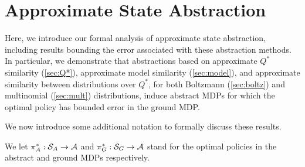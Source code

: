 \section{Approximate State Abstraction}

Here, we introduce our formal analysis of approximate state abstraction, including results bounding the error associated with these abstraction methods. In particular, we demonstrate that abstractions based on approximate $Q^*$ similarity (\ref{sec:Q*}), approximate model similarity (\ref{sec:model}), and approximate similarity between distributions over $Q^*$, for both Boltzmann (\ref{sec:boltz}) and multinomial (\ref{sec:mult}) distributions, induce abstract \acp{MDP} for which the optimal policy has bounded error in the ground MDP.





We now introduce some additional notation to formally discuss these results.

We let $\pi_A^* : \mathcal{S}_A \rightarrow \mathcal{A}$ and $\pi_G^* : \mathcal{S}_G \rightarrow \mathcal{A}$ stand for the optimal policies in the abstract and ground \acp{MDP} respectively.
\edefn

